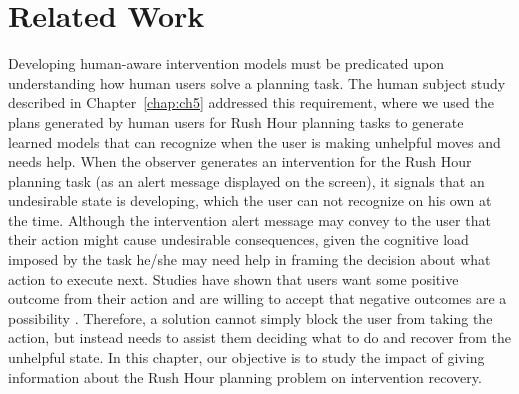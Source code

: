 \section{Related Work}
Developing human-aware intervention models must be predicated upon understanding how human users solve a planning task. 
The human subject study described in Chapter~\ref{chap:ch5} addressed this requirement, where we used the plans generated by human users for Rush Hour planning tasks to generate learned models that can recognize when the user is making unhelpful moves and needs help.
When the observer generates an intervention for the Rush Hour planning task (as an alert message displayed on the screen), it signals that an undesirable state is developing, which the user can not recognize on his own at the time.
Although the intervention alert message may convey to the user that their action might cause undesirable consequences, given the cognitive load imposed by the task he/she may need help in framing the decision about what action to execute next. 
Studies have shown that users want some positive outcome from their action and are willing to accept that negative outcomes are a possibility \cite{good2005stopping, govani2005, debatin2009facebook, byrne2016}. 
Therefore, a solution cannot simply block the user from taking the action, but instead needs to assist them deciding what to do and recover from the unhelpful state. 
In this chapter, our objective is to study the impact of giving information about the Rush Hour planning problem on intervention recovery.

